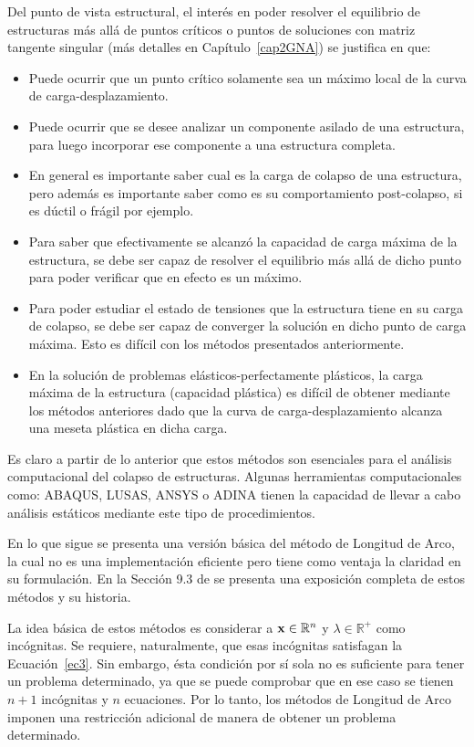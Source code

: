 Del punto de vista estructural, el interés en poder resolver el equilibrio de estructuras más allá de puntos críticos o puntos de soluciones con matriz tangente singular (más detalles en Capítulo~\ref{cap2GNA}) se justifica en que:
%
\begin{itemize}
	\item Puede ocurrir que un punto crítico solamente sea un máximo local de la curva de carga-desplazamiento.
	\item Puede ocurrir que se desee analizar un componente asilado de una estructura, para luego incorporar ese componente a una estructura completa.
	\item En general es importante saber cual es la carga de colapso de una estructura, pero además es importante saber como es su comportamiento post-colapso, si es dúctil o frágil por ejemplo.
	\item Para saber que efectivamente se alcanzó la capacidad de carga máxima de la estructura, se debe ser capaz de resolver el equilibrio más allá de dicho punto para poder verificar que en efecto es un máximo.
	\item Para poder estudiar el estado de tensiones que la estructura tiene en su carga de colapso, se debe ser capaz de converger la solución en dicho punto de carga máxima. Esto es difícil con los métodos presentados anteriormente.
	\item En la solución de problemas elásticos-perfectamente plásticos, la carga máxima de la estructura (capacidad plástica) es difícil de obtener mediante los métodos anteriores dado que la curva de carga-desplazamiento alcanza una meseta plástica en dicha carga.
\end{itemize}

Es claro a partir de lo anterior que estos métodos son esenciales para el análisis computacional del colapso de estructuras. Algunas herramientas computacionales como: ABAQUS\textsuperscript{\textregistered}, LUSAS\textsuperscript{\textregistered}, ANSYS\textsuperscript{\textregistered} o ADINA\textsuperscript{\textregistered} tienen la capacidad de llevar a cabo análisis estáticos mediante este tipo de procedimientos.

En lo que sigue se presenta una versión básica del método de Longitud de Arco, la cual no es una implementación eficiente pero tiene como ventaja la claridad en su formulación. En la Sección 9.3 de \citep{crisfield1996non} se presenta una exposición completa de estos métodos y su historia.

La idea básica de estos métodos es considerar a ${\bf x}\in\mathbb{R}^n$ y $\lambda\in\mathbb{R}^+$ como incógnitas. Se requiere, naturalmente, que esas incógnitas satisfagan la Ecuación~\eqref{ec3}. %
%
Sin embargo, ésta condición por sí sola no es suficiente para tener un problema determinado, ya que se puede comprobar que en ese caso se tienen $n+1$ incógnitas y $n$ ecuaciones. Por lo tanto, los métodos de Longitud de Arco imponen una restricción adicional de manera de obtener un problema determinado.

